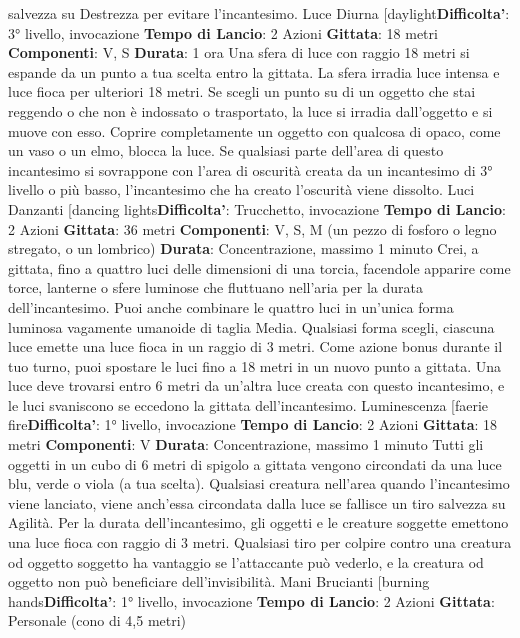\begin{multicols}{2}
salvezza su Destrezza per evitare l’incantesimo.
Luce Diurna
[daylight\textbf{Difficolta'}:
3° livello, invocazione
\textbf{Tempo di Lancio}: 2 Azioni
\textbf{Gittata}: 18 metri
\textbf{Componenti}: V, S
\textbf{Durata}: 1 ora
Una sfera di luce con raggio 18 metri si espande da un
punto a tua scelta entro la gittata. La sfera irradia luce
intensa e luce fioca per ulteriori 18 metri.
Se scegli un punto su di un oggetto che stai reggendo o
che non è indossato o trasportato, la luce si irradia
dall’oggetto e si muove con esso. Coprire
completamente un oggetto con qualcosa di opaco,
come un vaso o un elmo, blocca la luce.
Se qualsiasi parte dell’area di questo incantesimo si
sovrappone con l’area di oscurità creata da un
incantesimo di 3° livello o più basso, l’incantesimo che
ha creato l’oscurità viene dissolto.
Luci Danzanti
[dancing lights\textbf{Difficolta'}:
Trucchetto, invocazione
\textbf{Tempo di Lancio}: 2 Azioni
\textbf{Gittata}: 36 metri
\textbf{Componenti}: V, S, M (un pezzo di fosforo o legno
stregato, o un lombrico)
\textbf{Durata}: Concentrazione, massimo 1 minuto
Crei, a gittata, fino a quattro luci delle dimensioni di una
torcia, facendole apparire come torce, lanterne o sfere
luminose che fluttuano nell’aria per la durata
dell’incantesimo. Puoi anche combinare le quattro luci
in un’unica forma luminosa vagamente umanoide di
taglia Media. Qualsiasi forma scegli, ciascuna luce
emette una luce fioca in un raggio di 3 metri.
Come azione bonus durante il tuo turno, puoi spostare
le luci fino a 18 metri in un nuovo punto a gittata. Una
luce deve trovarsi entro 6 metri da un’altra luce creata
con questo incantesimo, e le luci svaniscono se
eccedono la gittata dell’incantesimo.
Luminescenza
[faerie fire\textbf{Difficolta'}:
1° livello, invocazione
\textbf{Tempo di Lancio}: 2 Azioni
\textbf{Gittata}: 18 metri
\textbf{Componenti}: V
\textbf{Durata}: Concentrazione, massimo 1 minuto
Tutti gli oggetti in un cubo di 6 metri di spigolo a gittata
vengono circondati da una luce blu, verde o viola (a tua
scelta). Qualsiasi creatura nell’area quando
l’incantesimo viene lanciato, viene anch’essa circondata
dalla luce se fallisce un tiro salvezza su Agilità. Per
la durata dell’incantesimo, gli oggetti e le creature
soggette emettono una luce fioca con raggio di 3 metri.
Qualsiasi tiro per colpire contro una creatura od oggetto
soggetto ha vantaggio se l’attaccante può vederlo, e la
creatura od oggetto non può beneficiare dell’invisibilità.
Mani Brucianti
[burning hands\textbf{Difficolta'}:
1° livello, invocazione
\textbf{Tempo di Lancio}: 2 Azioni
\textbf{Gittata}: Personale (cono di 4,5 metri)

\end{multicols}
